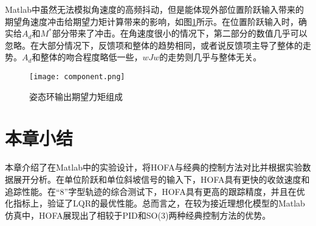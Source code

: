 Matlab中虽然无法模拟角速度的高频抖动，但是能体现外部位置阶跃输入带来的期望角速度冲击给期望力矩计算带来的影响，如图\ref{fig:com}所示。在位置阶跃输入时，确实给$A_d$和$M^*$部分带来了冲击。在角速度很小的情况下，第二部分的数值几乎可以忽略。在大部分情况下，反馈项和整体的趋势相同，或者说反馈项主导了整体的走势。$A_d$和整体的吻合程度略低一些，$wJw$的走势则几乎与整体无关。

\begin{figure}[!h]
  \centering
  \texttt{[image: component.png]}
  \caption{姿态环输出期望力矩组成}
  \label{fig:com}
\end{figure}

\section{本章小结}
本章介绍了在Matlab中的实验设计，将HOFA与经典的控制方法对比并根据实验数据展开分析。在单位阶跃和单位斜坡信号的输入下，HOFA具有更快的收敛速度和追踪性能。在“8”字型轨迹的综合测试下，HOFA具有更高的跟踪精度，并且在优化指标上，验证了LQR的最优性能。总而言之，在较为接近理想化模型的Matlab仿真中，HOFA展现出了相较于PID和SO(3)两种经典控制方法的优势。